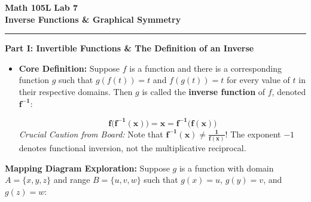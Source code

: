 \documentclass[10.5pt]{article}
\begin{document}
\noindent \textbf{\large Math 105L} \hfill \textbf{\large Lab 7}\\[1pt]
{\textbf{\Large Inverse Functions \& Graphical Symmetry}}\\[-5pt]
\rule{\textwidth}{1.2pt}

\vspace{0.03in}

\textbf{\large Part I: Invertible Functions \& The Definition of an Inverse}

\begin{itemize}[leftmargin=1.2em, topsep=1pt, itemsep=2pt]
  \item \textbf{Core Definition:} Suppose $f$ is a function and there is a corresponding function $g$ such that $g(f(t)) = t$ and $f(g(t)) = t$ for every value of $t$ in their respective domains. Then $g$ is called the \textbf{inverse function} of $f$, denoted $\mathbf{f^{-1}}$:
  \begin{tcolorbox}[colback=boxbg, colframe=boxframe, boxrule=0.8pt, arc=3pt, left=8pt, right=8pt, top=4pt, bottom=4pt]
  \[
    \mathbf{f\big(f^{-1}(x)\big) = x = f^{-1}\big(f(x)\big)}
  \]
  \textit{Crucial Caution from Board:} Note that $\mathbf{f^{-1}(x) \neq \frac{1}{f(x)}}$! The exponent $-1$ denotes functional inversion, not the multiplicative reciprocal.
  \end{tcolorbox}
\end{itemize}

\vspace{0.02in}

\textbf{Mapping Diagram Exploration:}
Suppose $g$ is a function with domain $A = \{x, y, z\}$ and range $B = \{u, v, w\}$ such that $g(x) = u$, $g(y) = v$, and $g(z) = w$:

\begin{center}
\end{center}
\end{document}
